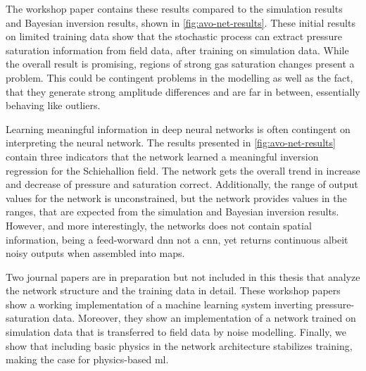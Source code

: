 
The workshop paper \citet{dramsch2019deep} contains these results compared to the simulation results and Bayesian inversion results, shown in \cref{fig:avo-net-results}. These initial results on limited training data show that the stochastic process can extract pressure saturation information from field data, after training on simulation data. While the overall result is promising, regions of strong gas saturation changes present a problem. This could be contingent problems in the modelling as well as the fact, that they generate strong amplitude differences and are far in between, essentially behaving like outliers. 

Learning meaningful information in deep neural networks is often contingent on interpreting the neural network. The results presented in \cref{fig:avo-net-results} contain three indicators that the network learned a meaningful inversion regression for the Schiehallion field. The network gets the overall trend in increase and decrease of pressure and saturation correct. Additionally, the range of output values for the network is unconstrained, but the network provides values in the ranges, that are expected from the simulation and Bayesian inversion results.  However, and more interestingly, the networks does not contain spatial information, being a feed-worward \ac{dnn} not a \ac{cnn}, yet returns continuous albeit noisy outputs when assembled into maps.

Two journal papers are in preparation but not included in this thesis that analyze the network structure and the training data in detail. These workshop papers show a working implementation of a machine learning system inverting pressure-saturation data. Moreover, they show an implementation of a network trained on simulation data that is transferred to field data by noise modelling. Finally, we show that including basic physics in the network architecture stabilizes training, making the case for physics-based \acl{ml}.



